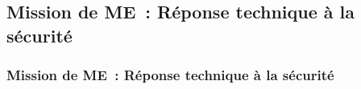 \subsection{Mission de ME~: Réponse technique à la sécurité}
\begin{frame}
	\frametitle{Mission de ME~: Réponse technique à la sécurité}
\end{frame}

